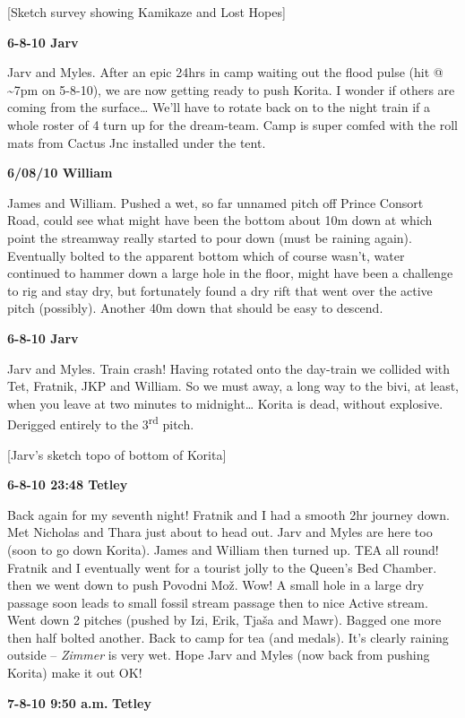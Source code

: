 {[}Sketch survey showing Kamikaze and Lost Hopes{]}

\textbf{6-8-10 Jarv}

Jarv and Myles. After an epic 24hrs in camp waiting out the flood pulse
(hit @ \textasciitilde{}7pm on 5-8-10), we are now getting ready to push
Korita. I wonder if others are coming from the surface\ldots{} We'll
have to rotate back on to the night train if a whole roster of 4 turn up
for the dream-team. Camp is super comfed with the roll mats from Cactus
Jnc installed under the tent.

\textbf{6/08/10 William}

James and William. Pushed a wet, so far unnamed pitch off Prince Consort
Road, could see what might have been the bottom about 10m down at which
point the streamway really started to pour down (must be raining again).
Eventually bolted to the apparent bottom which of course wasn't, water
continued to hammer down a large hole in the floor, might have been a
challenge to rig and stay dry, but fortunately found a dry rift that
went over the active pitch (possibly). Another 40m down that should be
easy to descend.

\textbf{6-8-10 Jarv}

Jarv and Myles. Train crash! Having rotated onto the day-train we
collided with Tet, Fratnik, JKP and William. So we must away, a long way
to the bivi, at least, when you leave at two minutes to midnight\ldots{}
Korita is dead, without explosive. Derigged entirely to the
3\textsuperscript{rd} pitch.

{[}Jarv's sketch topo of bottom of Korita{]}

\textbf{6-8-10 23:48 Tetley}

Back again for my seventh night! Fratnik and I had a smooth 2hr journey
down. Met Nicholas and Thara just about to head out. Jarv and Myles are
here too (soon to go down Korita). James and William then turned up. TEA
all round! Fratnik and I eventually went for a tourist jolly to the
Queen's Bed Chamber. then we went down to push Povodni Mož. Wow! A small
hole in a large dry passage soon leads to small fossil stream passage
then to nice Active stream. Went down 2 pitches (pushed by Izi, Erik,
Tjaša and Mawr). Bagged one more then half bolted another. Back to camp
for tea (and medals). It's clearly raining outside -- \emph{Zimmer} is
very wet. Hope Jarv and Myles (now back from pushing Korita) make it out
OK!

\textbf{7-8-10 9:50 a.m.} \textbf{Tetley}

